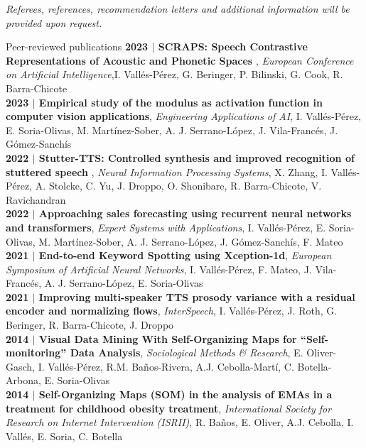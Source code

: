 \documentclass{resume} %
\begin{document}
\begin{flushright}
	\small{\textit{Referees, references, recommendation letters and additional information will be provided upon request.}}
\end{flushright}
\newpage
\begin{rSection}{Peer-reviewed publications}
{\textbf{{2023} $|$ SCRAPS: Speech Contrastive Representations of Acoustic and Phonetic Spaces }, \textit{European Conference on Artificial Intelligence},I. Vallés-Pérez, G. Beringer, P. Bilinski, G. Cook, R. Barra-Chicote}\\
{\textbf{{2023} $|$ Empirical study of the modulus as activation function in computer vision applications}, \textit{Engineering Applications of AI}, I. Vallés-Pérez, E. Soria-Olivas, M. Martínez-Sober, A. J. Serrano-López, J. Vila-Francés, J. Gómez-Sanchís}\\
{\textbf{{2022} $|$ Stutter-TTS: Controlled synthesis and improved recognition of stuttered speech }, \textit{Neural Information Processing Systems}, X. Zhang, I. Vallés-Pérez, A. Stolcke, C. Yu, J. Droppo, O. Shonibare, R. Barra-Chicote, V. Ravichandran}\\
{\textbf{{2022} $|$ Approaching sales forecasting using recurrent neural networks and transformers}, \textit{Expert Systems with Applications}, I. Vallés-Pérez, E. Soria-Olivas, M. Martínez-Sober, A. J. Serrano-López, J. Gómez-Sanchís, F. Mateo}\\
{\textbf{{2021} $|$ End-to-end Keyword Spotting using Xception-1d}, \textit{European Symposium of Artificial Neural Networks}, I. Vallés-Pérez, F. Mateo, J. Vila-Francés, A. J. Serrano-López, E. Soria-Olivas}\\
{\textbf{{2021} $|$ Improving multi-speaker TTS prosody variance with a residual encoder and normalizing flows}, \textit{InterSpeech}, I. Vallés-Pérez, J. Roth, G. Beringer, R. Barra-Chicote, J. Droppo}\\
{\textbf{{2014} $|$ Visual Data Mining With Self-Organizing Maps for ``Self-monitoring'' Data Analysis}, \textit{Sociological Methods \& Research}, E. Oliver-Gasch, I. Vallés-Pérez, R.M. Baños-Rivera, A.J. Cebolla-Martí, C. Botella-Arbona, E. Soria-Olivas}\\
{\textbf{{2014} $|$ Self-Organizing Maps (SOM) in the analysis of EMAs in a treatment for childhood obesity treatment}, \textit{International Society for Research on Internet Intervention (ISRII)}, R. Baños, E. Oliver, A.J. Cebolla, I. Vallés, E. Soria, C. Botella}

\end{rSection}

\vspace{\fill}
\end{document}
